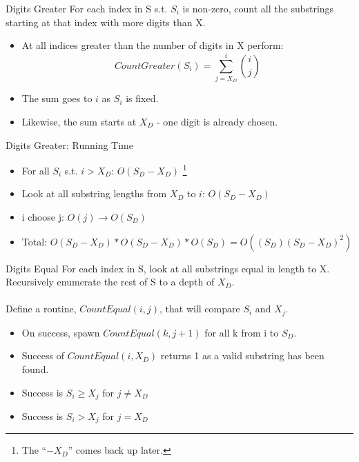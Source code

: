 \documentclass[10pt]{beamer}
\begin{document}
\begin{frame}{Digits Greater}
  \large
  For each index in S s.t. $S_{i}$ is non-zero, count all the substrings starting at that index with more digits than X.
  \begin{itemize} %
    \item At all indices greater than the number of digits in X perform:
      \begin{equation*}
        CountGreater(S_{i}) = \sum_{j = X_{D}}^{i} \binom{i}{j}
      \end{equation*}
    \item The sum goes to $i$ as $S_{i}$ is fixed.
    \item Likewise, the sum starts at $X_{D}$ \-- one digit is already chosen.
  \end{itemize}
\end{frame}

\begin{frame}{Digits Greater: Running Time}
  \large
  \begin{itemize} %
    \item For all $S_{i}$ s.t. $i > X_{D}$: $O(S_D - X_D)$ \footnote{The ``$- X_D$'' comes back up later.}
    \item Look at all substring lengths from $X_D$ to $i$: $O(S_D - X_D)$
    \item i choose j: $O(j) \rightarrow O(S_D)$
    \item Total: $O(S_D - X_D)*O(S_D - X_D)*O(S_D) = O((S_{D})(S_{D} - X_D)^{2})$
  \end{itemize}
\end{frame}

\begin{frame}{Digits Equal}
  \large
  For each index in S, look at all substrings equal in length to X.
  Recursively enumerate the rest of S to a depth of $X_{D}$. \\ \\
  Define a routine, $CountEqual(i,j)$, that will compare $S_{i}$ and $X_{j}$.
  \begin{itemize}
    \item On success, spawn $CountEqual(k, j + 1)$ for all k from i to $S_{D}$.
    \item Success of $CountEqual(i, X_{D})$ returns 1 as a valid substring has been found.
    \item Success is $S_{i} \ge X_{j}$ for $j \ne X_{D}$
    \item Success is $S_{i} > X_{j}$ for $j = X_{D}$
  \end{itemize}
\end{frame}
\end{document}
